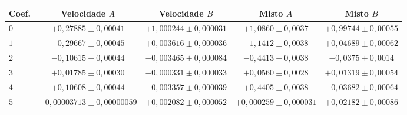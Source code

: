 \begin{tabular}{lcccc}
\hline
Coef. & Velocidade $A$ & Velocidade $B$ & Misto $A$ & Misto $B$ \\
\hline
$0$ & $+0{,}27885\pm0{,}00041$ & $+1{,}000244\pm0{,}000031$ & $+1{,}0860\pm0{,}0037$ & $+0{,}99744\pm0{,}00055$ \\
$1$ & $-0{,}29667\pm0{,}00045$ & $+0{,}003616\pm0{,}000036$ & $-1{,}1412\pm0{,}0038$ & $+0{,}04689\pm0{,}00062$ \\
$2$ & $-0{,}10615\pm0{,}00044$ & $-0{,}003465\pm0{,}000084$ & $-0{,}4413\pm0{,}0038$ & $-0{,}0375\pm0{,}0014$ \\
$3$ & $+0{,}01785\pm0{,}00030$ & $-0{,}000331\pm0{,}000033$ & $+0{,}0560\pm0{,}0028$ & $+0{,}01319\pm0{,}00054$ \\
$4$ & $+0{,}10608\pm0{,}00044$ & $-0{,}003357\pm0{,}000039$ & $+0{,}4405\pm0{,}0038$ & $-0{,}03682\pm0{,}00064$ \\
$5$ & $+0{,}00003713\pm0{,}00000059$ & $+0{,}002082\pm0{,}000052$ & $+0{,}000259\pm0{,}000031$ & $+0{,}02182\pm0{,}00086$ \\
\hline
\end{tabular}
